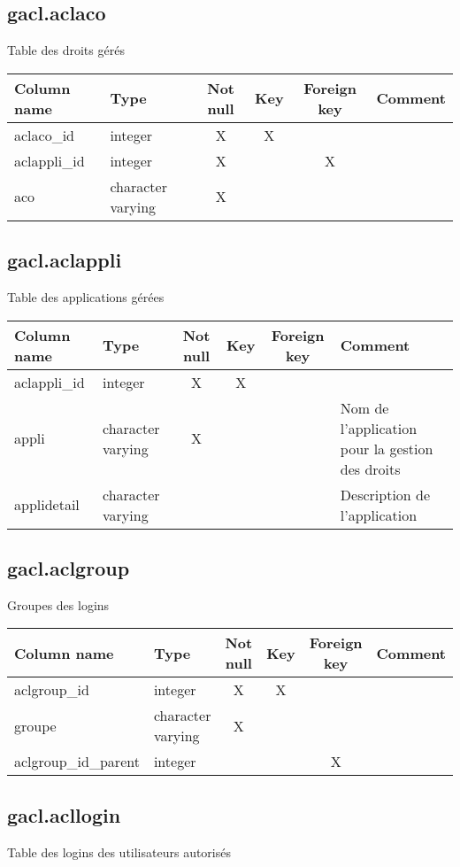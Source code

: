 \subsection{gacl.aclaco}
Table des droits gérés

\begin{tabular}{|l| p{2cm}|c|c|c| p{3cm}|}
\hline
Column name & Type & Not null & Key & Foreign key & Comment \\
\hline
aclaco\_id & integer & X & X & & \\
\hline
aclappli\_id & integer & X & & X & \\
\hline
aco & character varying & X & & & \\
\hline
\end{tabular}
\subsection{gacl.aclappli}
Table des applications gérées

\begin{tabular}{|l| p{2cm}|c|c|c| p{3cm}|}
\hline
Column name & Type & Not null & Key & Foreign key & Comment \\
\hline
aclappli\_id & integer & X & X & & \\
\hline
appli & character varying & X & & & Nom de l'application pour la gestion des droits\\
\hline
applidetail & character varying & & & & Description de l'application\\
\hline
\end{tabular}
\subsection{gacl.aclgroup}
Groupes des logins

\begin{tabular}{|l| p{2cm}|c|c|c| p{3cm}|}
\hline
Column name & Type & Not null & Key & Foreign key & Comment \\
\hline
aclgroup\_id & integer & X & X & & \\
\hline
groupe & character varying & X & & & \\
\hline
aclgroup\_id\_parent & integer & & & X & \\
\hline
\end{tabular}
\subsection{gacl.acllogin}
Table des logins des utilisateurs autorisés


